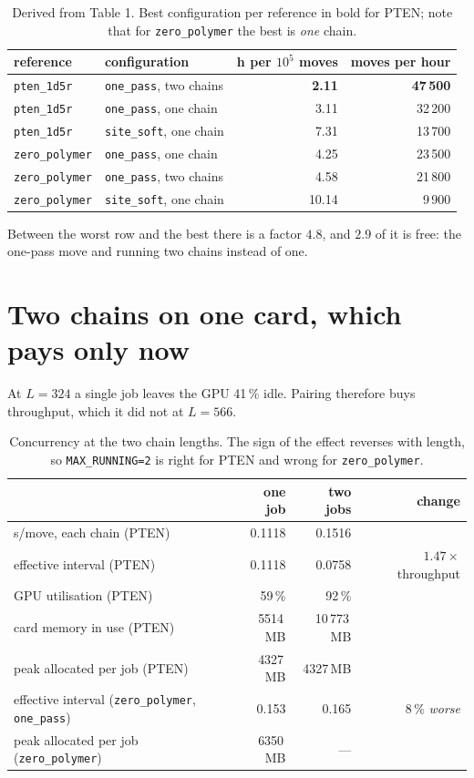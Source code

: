 \documentclass[11pt,a4paper]{article}
\newcommand{\file}[1]{\texttt{#1}}
\begin{document}
\begin{table}[h]
\centering
\begin{tabular}{llrr}
\toprule
reference & configuration & h per $10^5$ moves & moves per hour \\
\midrule
\file{pten\_1d5r}    & \texttt{one\_pass}, two chains  & \textbf{2.11} & \textbf{47\,500} \\
\file{pten\_1d5r}    & \texttt{one\_pass}, one chain   & 3.11 & 32\,200 \\
\file{pten\_1d5r}    & \texttt{site\_soft}, one chain  & 7.31 & 13\,700 \\
\file{zero\_polymer} & \texttt{one\_pass}, one chain   & 4.25 & 23\,500 \\
\file{zero\_polymer} & \texttt{one\_pass}, two chains  & 4.58 & 21\,800 \\
\file{zero\_polymer} & \texttt{site\_soft}, one chain  & 10.14 & 9\,900 \\
\bottomrule
\end{tabular}
\caption{Derived from Table 1. Best configuration per reference in bold for
PTEN; note that for \file{zero\_polymer} the best is \emph{one} chain.}
\end{table}

\noindent
Between the worst row and the best there is a factor $4.8$, and $2.9$ of it is
free: the one-pass move and running two chains instead of one.

\section{Two chains on one card, which pays only now}

At $L=324$ a single job leaves the GPU 41\,\% idle. Pairing therefore buys
throughput, which it did not at $L=566$.

\begin{table}[h]
\centering
\begin{tabular}{lrrr}
\toprule
 & one job & two jobs & change \\
\midrule
s/move, each chain (PTEN)      & 0.1118 & 0.1516 & \\
effective interval (PTEN)      & 0.1118 & 0.0758 & $1.47\times$ throughput \\
GPU utilisation (PTEN)         & 59\,\% & 92\,\% & \\
card memory in use (PTEN)      & 5514\,MB & 10\,773\,MB & \\
peak allocated per job (PTEN)  & 4327\,MB & 4327\,MB & \\
\midrule
effective interval (\file{zero\_polymer}, \texttt{one\_pass}) & 0.153 & 0.165 & 8\,\% \emph{worse} \\
peak allocated per job (\file{zero\_polymer}) & 6350\,MB & --- & \\
\bottomrule
\end{tabular}
\caption{Concurrency at the two chain lengths. The sign of the effect reverses
with length, so \texttt{MAX\_RUNNING=2} is right for PTEN and wrong for
\file{zero\_polymer}.}
\end{table}
\end{document}
